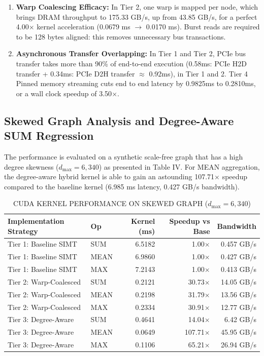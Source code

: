 \documentclass[journal]{IEEEtran}
\begin{document}
\begin{enumerate}
    \item \textbf{Warp Coalescing Efficacy:} In Tier 2, one warp is mapped per node, which brings DRAM throughput to 175.33 GB/s, up from 43.85 GB/s, for a perfect 4.00$\times$ kernel acceleration (0.0679 ms $\to$ 0.0170 ms). Burst reads are required to be 128 bytes aligned: this removes unnecessary bus transactions.
    \item \textbf{Asynchronous Transfer Overlapping:} In Tier 1 and Tier 2, PCIe bus transfer takes more than 90\% of end-to-end execution (0.58ms: PCIe H2D transfer + 0.34ms: PCIe D2H transfer $\approx$ 0.92ms), in Tier 1 and 2. Tier 4 Pinned memory streaming cuts end to end latency by 0.9825ms to 0.2810ms, or a wall clock speedup of 3.50$\times$.
\end{enumerate}

\subsection{Skewed Graph Analysis and Degree-Aware SUM Regression}
The performance is evaluated on a synthetic scale-free graph that has a high degree skewness ($d_{\text{max}} = 6,340$) as presented in Table IV. For MEAN aggregation, the degree-aware hybrid kernel is able to gain an astounding 107.71$\times$ speedup compared to the baseline kernel (6.985 ms latency, 0.427 GB/s bandwidth).

\begin{table}[!t]
\centering
\caption{CUDA KERNEL PERFORMANCE ON SKEWED GRAPH ($d_{\text{max}} = 6,340$)}
\label{tab:skewed}
\begin{tabular}{llrrr}
\toprule
\textbf{Implementation Strategy} & \textbf{Op} & \textbf{Kernel (ms)} & \textbf{Speedup vs Base} & \textbf{Bandwidth} \\
\midrule
Tier 1: Baseline SIMT & SUM  & 6.5182 & 1.00$\times$ & 0.457 GB/s \\
Tier 1: Baseline SIMT & MEAN & 6.9860 & 1.00$\times$ & 0.427 GB/s \\
Tier 1: Baseline SIMT & MAX  & 7.2143 & 1.00$\times$ & 0.413 GB/s \\
\midrule
Tier 2: Warp-Coalesced & SUM  & 0.2121 & 30.73$\times$ & 14.05 GB/s \\
Tier 2: Warp-Coalesced & MEAN & 0.2198 & 31.79$\times$ & 13.56 GB/s \\
Tier 2: Warp-Coalesced & MAX  & 0.2334 & 30.91$\times$ & 12.77 GB/s \\
\midrule
Tier 3: Degree-Aware   & SUM  & 0.4641 & 14.04$\times$ & 6.42 GB/s \\
Tier 3: Degree-Aware   & MEAN & 0.0649 & 107.71$\times$ & 45.95 GB/s \\
Tier 3: Degree-Aware   & MAX  & 0.1106 & 65.21$\times$ & 26.94 GB/s \\
\bottomrule
\end{tabular}
\end{table}
\end{document}
